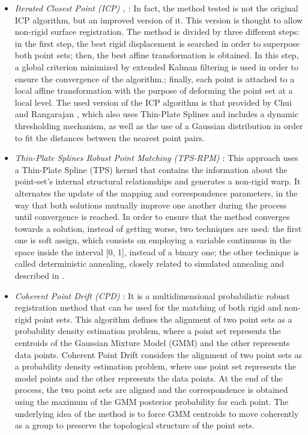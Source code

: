 \begin{itemize}
 \item \textit{Iterated Closest Point (ICP) \cite{besl1992method}, \cite{feldmar1996rigid}}: In fact, the method tested 
is not the original ICP algorithm, but an improved version of it. This version is thought to allow non-rigid surface 
registration. The method is divided by three different steps: in the first step, the best rigid displacement is searched 
in order to superpose both point sets; then, the best affine transformation is obtained. In this step, a global 
criterion minimized by extended Kalman filtering is used in order to ensure the convergence of the algorithm.; finally, 
each point is attached to a local affine transformation with the purpose of deforming the point set at a local level. 
The used version of the ICP algorithm is that provided by Chui and Rangarajan \cite{chui2000new}, which also uses 
Thin-Plate Splines and includes a dynamic thresholding mechanism, as well as the use of a Gaussian distribution in order 
to fit the distances between the nearest point pairs.
 \item \textit{Thin-Plate Splines Robust Point Matching (TPS-RPM) \cite{chui2000new}}: This approach uses a Thin-Plate Spline (TPS) kernel that contains the information about the point-set's internal structural relationships and generates a non-rigid warp.
 It alternates the update of the mapping and correspondence parameters, in the way that both solutions mutually improve one another during the process until convergence is reached. In order to ensure that the method converges towards a solution, instead of getting worse, two techniques are used: the first one is soft assign, which consists on employing a variable continuous in the space inside the interval [0, 1], instead of a binary one; the other technique is called deterministic annealing, closely related to simulated annealing and described in \cite{geiger1991parallel}.
 \item \textit{Coherent Point Drift (CPD) \cite{myronenko2010point}}: It is a multidimensional probabilistic robust registration method that can be used for the matching of both rigid and non-rigid point sets. This algorithm defines the alignment of two point sets as a probability density estimation problem, where a point set represents the centroids of the Gaussian Mixture Model (GMM) and the other represents data points. Coherent Point Drift considers the alignment of two point sets as a probability density estimation problem, where one point set represents the model points and the other represents the data points. At the end of the process, the two point sets are aligned and the correspondence is obtained using the maximum of the GMM posterior probability for each point. The underlying idea of the method is to force GMM centroids to move coherently as a group to preserve the topological structure of the point sets.

\end{itemize}
